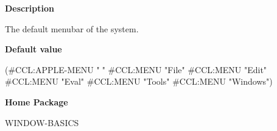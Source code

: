  
{\bf Description}

The default menubar of the system.

 
{\bf Default value}

(\#\<CCL:APPLE-MENU ""\> \#\<CCL:MENU "File"\> \#\<CCL:MENU "Edit"\> \#\<CCL:MENU "Eval"\> \#\<CCL:MENU "Tools"\> \#\<CCL:MENU "Windows"\>)

 
{\bf Home Package}

WINDOW-BASICS

